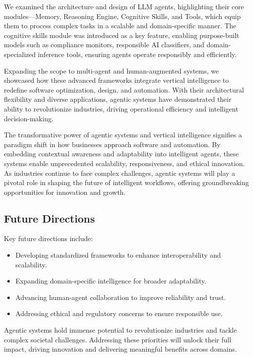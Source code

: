 \documentclass[12pt]{article}
\begin{document}
We examined the architecture and design of LLM agents, highlighting their core modules—Memory, Reasoning Engine, Cognitive Skills, and Tools, which equip them to process complex tasks in a scalable and domain-specific manner. The cognitive skills module was introduced as a key feature, enabling purpose-built models such as compliance monitors, responsible AI classifiers, and domain-specialized inference tools, ensuring agents operate responsibly and efficiently.

Expanding the scope to multi-agent and human-augmented systems, we showcased how these advanced frameworks integrate vertical intelligence to redefine software optimization, design, and automation. With their architectural flexibility and diverse applications, agentic systems have demonstrated their ability to revolutionize industries, driving operational efficiency and intelligent decision-making.

The transformative power of agentic systems and vertical intelligence signifies a paradigm shift in how businesses approach software and automation. By embedding contextual awareness and adaptability into intelligent agents, these systems enable unprecedented scalability, responsiveness, and ethical innovation. As industries continue to face complex challenges, agentic systems will play a pivotal role in shaping the future of intelligent workflows, offering groundbreaking opportunities for innovation and growth.

\newpage

\subsection{Future Directions}
Key future directions include:
\begin{itemize}
    \item Developing standardized frameworks to enhance interoperability and scalability.
    \item Expanding domain-specific intelligence for broader adaptability.
    \item Advancing human-agent collaboration to improve reliability and trust.
    \item Addressing ethical and regulatory concerns to ensure responsible use.
\end{itemize}

Agentic systems hold immense potential to revolutionize industries and tackle complex societal challenges. Addressing these priorities will unlock their full impact, driving innovation and delivering meaningful benefits across domains.

\end{document}

